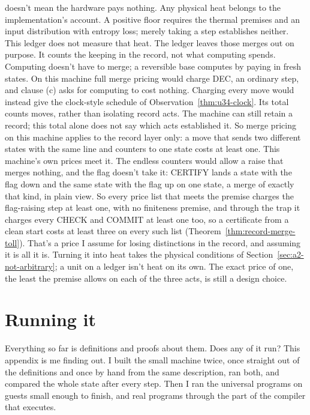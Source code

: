 \documentclass[11pt,twoside]{article}
\theoremstyle{thielethm}
\theoremstyle{thieledef}
\theoremstyle{thieledef}
\theoremstyle{thieledef}
\theoremstyle{thielethm}
\theoremstyle{thieleobs}
\theoremstyle{thielethm}
\begin{document}
\begin{itemize}
doesn't mean the hardware pays nothing. Any physical heat belongs to the implementation's account. A positive floor
requires the thermal premises and an input distribution with entropy loss;
merely taking a step establishes neither. This ledger does not measure that heat. The
ledger leaves those merges out on purpose. It counts the keeping in the record, not what computing
spends. Computing doesn't have to merge; a reversible base computes by paying in fresh states. On this machine
full merge pricing would charge DEC, an ordinary step, and clause (c) asks for computing to cost
nothing. Charging every move would instead give the clock-style schedule of
Observation~\ref{thm:u34-clock}. Its total counts moves, rather than isolating
record acts. The machine can still retain a record; this total alone does not
say which acts established it. So
merge pricing on this machine applies to the record layer only: a move that sends two different
states with the same line and counters to one state costs at least one. This machine's own prices
meet it. The endless counters would allow a raise that merges nothing, and the flag
doesn't take it: CERTIFY lands a state with the flag down and the same state with the flag up on
one state, a merge of exactly that kind, in plain view. So every price list that meets the premise charges the flag-raising step at least one, with no finiteness premise, and through the trap it charges every CHECK and COMMIT at least one too, so a certificate from a clean start costs at least three on every such list (Theorem~\ref{thm:record-merge-toll}). That's a price I assume for losing distinctions in the
record, and assuming it is all it is. Turning it into heat takes the physical conditions of
Section~\ref{sec:a2-not-arbitrary}; a unit on a ledger isn't heat on its own. The exact price of one, the least the premise allows on each of the three acts, is still a design choice.
\end{itemize}


\section{Running it}

Everything so far is definitions and proofs about them. Does any of it run? This appendix is
me finding out. I built the small machine twice, once straight out of the definitions and once
by hand from the same description, ran both, and compared the whole state after every step.
Then I ran the universal programs on guests small enough to finish, and real programs through
the part of the compiler that executes.
\end{document}
